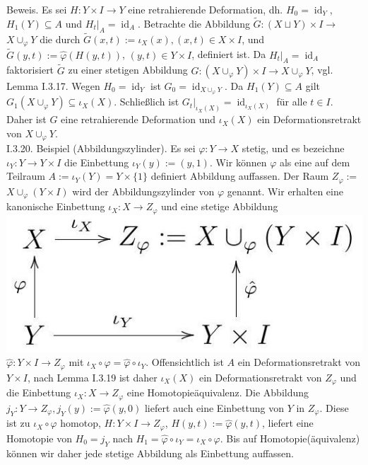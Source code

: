 \documentclass[10pt]{article}
\begin{document}
Beweis. Es sei $H: Y \times I \rightarrow Y$ eine retrahierende Deformation, dh. $H_{0}=\operatorname{id}_{Y}$, $H_{1}(Y) \subseteq A$ und $\left.H_{t}\right|_{A}=\operatorname{id}_{A}$. Betrachte die Abbildung $\tilde{G}:(X \sqcup Y) \times I \rightarrow$ $X \cup_{\varphi} Y$ die durch $\tilde{G}(x, t):=\iota_{X}(x),(x, t) \in X \times I$, und $\tilde{G}(y, t):=\hat{\varphi}(H(y, t))$, $(y, t) \in Y \times I$, definiert ist. Da $\left.H_{t}\right|_{A}=\operatorname{id}_{A}$ faktorisiert $\tilde{G}$ zu einer stetigen Abbildung $G:\left(X \cup_{\varphi} Y\right) \times I \rightarrow X \cup_{\varphi} Y$, vgl. Lemma I.3.17. Wegen $H_{0}=\operatorname{id}_{Y}$ ist $G_{0}=\operatorname{id}_{X \cup_{\varphi} Y}$. Da $H_{1}(Y) \subseteq A$ gilt $G_{1}\left(X \cup_{\varphi} Y\right) \subseteq \iota_{X}(X)$. Schließlich ist $\left.G_{t}\right|_{\iota_{X}(X)}=\operatorname{id}_{\iota_{X}(X)}$ für alle $t \in I$. Daher ist $G$ eine retrahierende Deformation und $\iota_{X}(X)$ ein Deformationsretrakt von $X \cup_{\varphi} Y$.\\
I.3.20. Beispiel (Abbildungszylinder). Es sei $\varphi: Y \rightarrow X$ stetig, und es bezeichne $\iota_{Y}: Y \rightarrow Y \times I$ die Einbettung $\iota_{Y}(y):=(y, 1)$. Wir können $\varphi$ als eine auf dem Teilraum $A:=\iota_{Y}(Y)=Y \times\{1\}$ definiert Abbildung auffassen. Der Raum $Z_{\varphi}:=$ $X \cup_{\varphi}(Y \times I)$ wird der Abbildungszylinder von $\varphi$ genannt. Wir erhalten eine kanonische Einbettung $\iota_{X}: X \rightarrow Z_{\varphi}$ und eine stetige Abbildung\\
\includegraphics[max width=\textwidth]{2025_06_05_d7ed2bacd1e9ce1db1f0g-028} $\hat{\varphi}: Y \times I \rightarrow Z_{\varphi}$ mit $\iota_{X} \circ \varphi=\hat{\varphi} \circ \iota_{Y}$. Offensichtlich ist $A$ ein Deformationsretrakt von $Y \times I$, nach Lemma I.3.19 ist daher $\iota_{X}(X)$ ein Deformationsretrakt von $Z_{\varphi}$ und die Einbettung $\iota_{X}: X \rightarrow Z_{\varphi}$ eine Homotopieäquivalenz. Die Abbildung $j_{Y}: Y \rightarrow Z_{\varphi}, j_{Y}(y):=\hat{\varphi}(y, 0)$ liefert auch eine Einbettung von $Y$ in $Z_{\varphi}$. Diese ist zu $\iota_{X} \circ \varphi$ homotop, $H: Y \times I \rightarrow Z_{\varphi}$, $H(y, t):=\hat{\varphi}(y, t)$, liefert eine Homotopie von $H_{0}=j_{Y}$ nach $H_{1}=\hat{\varphi} \circ \iota_{Y}=\iota_{X} \circ \varphi$. Bis auf Homotopie(äquivalenz) können wir daher jede stetige Abbildung als Einbettung auffassen.
\end{document}
